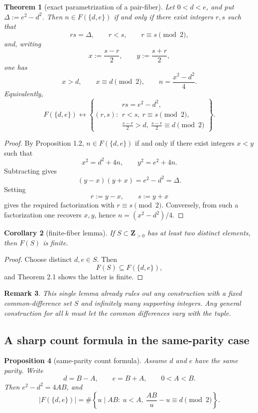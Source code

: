 \documentclass[11pt]{article}
\theoremstyle{plainbreak}
\newtheorem{theorem}{Theorem}[section]
\newtheorem{proposition}[theorem]{Proposition}
\newtheorem{corollary}[theorem]{Corollary}
\theoremstyle{defbreak}
\newtheorem{remark}[theorem]{Remark}
\newcommand{\Fset}{F}
\newcommand{\Z}{\mathbf{Z}}
\begin{document}
\begin{theorem}[exact parametrization of a pair-fiber]
Let $0<d<e$, and put $\Delta:=e^2-d^2$. Then $n\in \Fset(\{d,e\})$ if and only if there exist integers $r,s$ such that
\[
rs=\Delta,\qquad r<s,\qquad r\equiv s\pmod 2,
\]
and, writing
\[
x:=\frac{s-r}{2},\qquad y:=\frac{s+r}{2},
\]
one has
\[
x>d,\qquad x\equiv d\pmod 2,\qquad n=\frac{x^2-d^2}{4}.
\]
Equivalently,
\[
\Fset(\{d,e\})\longleftrightarrow
\left\{(r,s):
\begin{array}{l}
rs=e^2-d^2,\\
r<s,\ r\equiv s\pmod 2,\\
\frac{s-r}{2}>d,\ \frac{s-r}{2}\equiv d\pmod 2
\end{array}\right\}.
\]
\end{theorem}

\begin{proof}
By Proposition 1.2, $n\in \Fset(\{d,e\})$ if and only if there exist integers $x<y$ such that
\[
x^2=d^2+4n,\qquad y^2=e^2+4n.
\]
Subtracting gives
\[
(y-x)(y+x)=e^2-d^2=\Delta.
\]
Setting
\[
r:=y-x,\qquad s:=y+x
\]
gives the required factorization with $r\equiv s\pmod 2$. Conversely, from such a factorization one recovers $x,y$, hence $n=(x^2-d^2)/4$.
\end{proof}

\begin{corollary}[finite-fiber lemma]
If $S\subset \Z_{>0}$ has at least two distinct elements, then $\Fset(S)$ is finite.
\end{corollary}

\begin{proof}
Choose distinct $d,e\in S$. Then
\[
\Fset(S)\subseteq \Fset(\{d,e\}),
\]
and Theorem 2.1 shows the latter is finite.
\end{proof}

\begin{remark}
This single lemma already rules out any construction with a \emph{fixed} common-difference set $S$ and infinitely many supporting integers. Any general construction for all $k$ must let the common differences vary with the tuple.
\end{remark}

\subsection{A sharp count formula in the same-parity case}

\begin{proposition}[same-parity count formula]
Assume $d$ and $e$ have the same parity. Write
\[
d=B-A,\qquad e=B+A,\qquad 0<A<B.
\]
Then $e^2-d^2=4AB$, and
\[
|\Fset(\{d,e\})|=
\#\left\{u\mid AB:\ u<A,\ \frac{AB}{u}-u\equiv d\pmod 2\right\}.
\]
\end{proposition}
\end{document}
